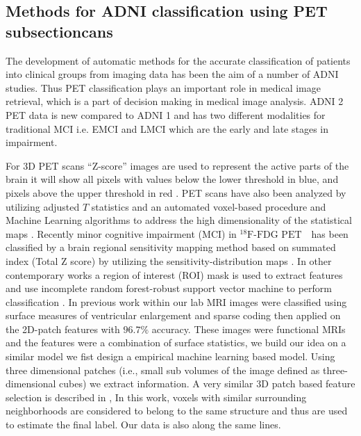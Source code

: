 \documentclass[authoryear,preprint,revi	ew,12pt]{elsarticle}
\newcommand{\FDGPET}   {$ ^{18}\textrm{F-FDG PET} $~}
\begin{document}
\subsection{Methods for ADNI classification using PET subsectioncans}
The development of automatic methods for the accurate classification of patients into clinical groups from imaging data has been the aim of a number of ADNI studies. Thus PET classification plays an important role in medical image retrieval, which is a part of decision making in medical image analysis. ADNI 2 PET data is new compared to ADNI 1 and has two different modalities for traditional MCI i.e. EMCI and LMCI which are the early and late stages in impairment.

For 3D PET scans ``Z-score'' images are used to represent the active parts of the brain it will show all pixels with values below the lower threshold in blue, and pixels above the upper threshold in red \citep{ishii2014pet}. PET scans have also been analyzed by utilizing adjusted $T$ statistics and an automated voxel-based procedure \citep{herholz2002discrimination} and Machine Learning algorithms to address the high dimensionality of the statistical maps \citep{illan201118,higdon2004comparison}. Recently minor cognitive impairment (MCI) in \FDGPET ~has been classified by a brain regional sensitivity mapping method based on summated index (Total Z score) by utilizing the sensitivity-distribution maps \citep{kakimoto2011new}. In other contemporary works a region of interest (ROI) mask is used to extract features and use incomplete random forest-robust support vector machine to perform classification \citep{lu2017early}. In previous work within our lab MRI images were classified using surface measures of ventricular enlargement and sparse coding then applied on the 2D-patch features \citep*{zhang2016hyperbolic,zhang2016applying} with $ 96.7 \% $ accuracy. These images were functional MRIs and the features were a combination of surface statistics, we build our idea on a similar model we fist design a empirical machine learning based model. Using three dimensional patches (i.e., small sub volumes of the image defined as three-dimensional cubes) we extract information. A very similar 3D patch based feature selection is described in \citep{coupe2011patch}, In  this work, voxels  with  similar  surrounding  neighborhoods  are  considered  to  belong  to  the  same  structure and thus are used to estimate the final label. Our data is also along the same lines. 
\end{document}

